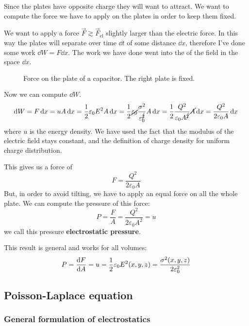 \documentclass[12pt]{extarticle}
\begin{document}
Since the plates have opposite charge they will want to attract.
We want to compute the force we have to apply on the plates in order to keep them fixed.

We want to apply a force $\vec F \gtrsim \vec F_\text{el}$ slightly larger than the electric force.
In this way the plates will separate over time $\dd{t}$ of some distance $\dd{x}$, therefore I've done some work $\dd{W} = F \dd{x}$.
The work we have done went into the  of the field in the space $\dd{x}$.

\begin{figure}[H]
	\centering
	
	\caption{Force on the plate of a capacitor. The right plate is fixed.}
\end{figure}

Now we can compute $\dd{W}$.
\begin{equation}
	\dd{W} = F \dd{x} = u A \dd{x} = \frac{1}{2} \varepsilon_0 E^2 A \dd{x} = \frac{1}{2} \cancel{\varepsilon_0} \frac{\sigma^2}{\varepsilon_0^{\cancel{2}}} A \dd{x} = \frac{1}{2} \frac{Q^2}{\varepsilon_0 A^{\cancel{2}}} \cancel{A} \dd{x} = \frac{Q^2}{2 \varepsilon_0 A} \dd{x}
\end{equation}
where $u$ is the energy density.
We have used the fact that the modulus of the electric field stays constant, and the definition of charge density for uniform charge distribution.

This gives us a force of
\begin{equation}
	F = \frac{Q^2}{2 \varepsilon_0 A}
\end{equation}
But, in order to avoid tilting, we have to apply an equal force on all the whole plate.
We can compute the pressure of this force:
\begin{equation}
	P = \frac{F}{A} = \frac{Q^2}{2 \varepsilon_0 A^2} = u
\end{equation}
we call this pressure \textbf{electrostatic pressure}.

This result is general and works for all volumes:
\begin{equation}
	P = \dv{F}{A} = u = \frac{1}{2} \varepsilon_0 E^2(x, y, z) = \frac{\sigma^2(x, y, z)}{2 \varepsilon_0^2}
\end{equation}

\subsection{Poisson-Laplace equation}

\subsubsection{General formulation of electrostatics}
\end{document}
